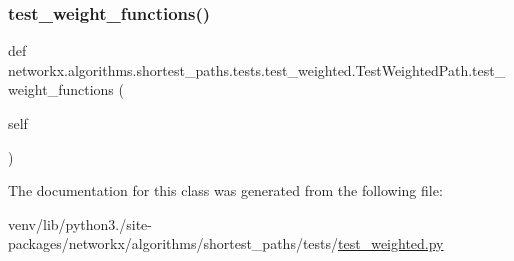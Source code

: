 \subsubsection{\texorpdfstring{test\+\_\+weight\+\_\+functions()}{test\_weight\_functions()}}
{\footnotesize\ttfamily def networkx.\+algorithms.\+shortest\+\_\+paths.\+tests.\+test\+\_\+weighted.\+Test\+Weighted\+Path.\+test\+\_\+weight\+\_\+functions (\begin{DoxyParamCaption}\item[{}]{self }\end{DoxyParamCaption})}



The documentation for this class was generated from the following file\+:\begin{DoxyCompactItemize}
\item 
venv/lib/python3./site-\/packages/networkx/algorithms/shortest\+\_\+paths/tests/\hyperlink{test__weighted_8py}{test\+\_\+weighted.\+py}\end{DoxyCompactItemize}
